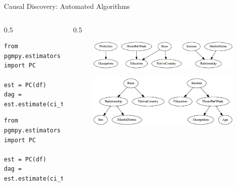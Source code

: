 \documentclass[aspectratio=169]{beamer}
\begin{document}
% 
% 

\begin{frame}[fragile]{Causal Discovery: Automated Algorithms}
	\begin{columns}
		\begin{column}{0.5 \textwidth}
			\begin{verbatim}
from pgmpy.estimators import PC

est = PC(df)
dag = est.estimate(ci_test='chi_square')
			\end{verbatim}
			\vspace{4em}

			\begin{verbatim}
from pgmpy.estimators import PC

est = PC(df)
dag = est.estimate(ci_test='pillai')
			\end{verbatim}
		\end{column}
		\begin{column}{0.5 \textwidth}
			\begin{figure}
				\includegraphics[scale=0.25]{imgs/adult_x2.png}
			\end{figure}
			\vspace{2em}
			\begin{figure}
				\includegraphics[scale=0.25]{imgs/adult_pillai.png}
			\end{figure}
		\end{column}
	\end{columns}



\end{frame}
\end{document}
